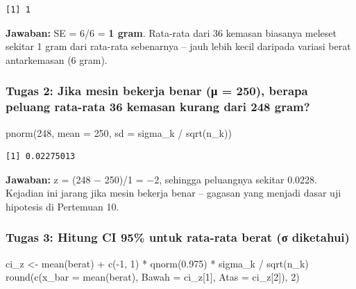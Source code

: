 \documentclass[
  indonesian,
  letterpaper,
]{book}
\newenvironment{Shaded}{\begin{snugshade}}{\end{snugshade}}
\newcommand{\AttributeTok}[1]{\textcolor[rgb]{0.40,0.45,0.13}{#1}}
\newcommand{\DecValTok}[1]{\textcolor[rgb]{0.68,0.00,0.00}{#1}}
\newcommand{\FloatTok}[1]{\textcolor[rgb]{0.68,0.00,0.00}{#1}}
\newcommand{\FunctionTok}[1]{\textcolor[rgb]{0.28,0.35,0.67}{#1}}
\newcommand{\NormalTok}[1]{\textcolor[rgb]{0.00,0.23,0.31}{#1}}
\newcommand{\OtherTok}[1]{\textcolor[rgb]{0.00,0.23,0.31}{#1}}
\newcommand{\SpecialCharTok}[1]{\textcolor[rgb]{0.37,0.37,0.37}{#1}}
\begin{document}
\begin{verbatim}
[1] 1
\end{verbatim}

\textbf{Jawaban:} SE = 6/6 = \textbf{1 gram}. Rata-rata dari 36 kemasan
biasanya meleset sekitar 1 gram dari rata-rata sebenarnya -- jauh lebih
kecil daripada variasi berat antarkemasan (6 gram).

\subsubsection{Tugas 2: Jika mesin bekerja benar (μ = 250), berapa
peluang rata-rata 36 kemasan kurang dari 248
gram?}\label{tugas-2-jika-mesin-bekerja-benar-ux3bc-250-berapa-peluang-rata-rata-36-kemasan-kurang-dari-248-gram}

\begin{Shaded}
\begin{Highlighting}[]
\FunctionTok{pnorm}\NormalTok{(}\DecValTok{248}\NormalTok{, }\AttributeTok{mean =} \DecValTok{250}\NormalTok{, }\AttributeTok{sd =}\NormalTok{ sigma\_k }\SpecialCharTok{/} \FunctionTok{sqrt}\NormalTok{(n\_k))}
\end{Highlighting}
\end{Shaded}

\begin{verbatim}
[1] 0.02275013
\end{verbatim}

\textbf{Jawaban:} z = (248 − 250)/1 = −2, sehingga peluangnya sekitar
0.0228. Kejadian ini jarang jika mesin bekerja benar -- gagasan yang
menjadi dasar uji hipotesis di Pertemuan 10.

\subsubsection{Tugas 3: Hitung CI 95\% untuk rata-rata berat (σ
diketahui)}\label{tugas-3-hitung-ci-95-untuk-rata-rata-berat-ux3c3-diketahui}

\begin{Shaded}
\begin{Highlighting}[]
\NormalTok{ci\_z }\OtherTok{\textless{}{-}} \FunctionTok{mean}\NormalTok{(berat) }\SpecialCharTok{+} \FunctionTok{c}\NormalTok{(}\SpecialCharTok{{-}}\DecValTok{1}\NormalTok{, }\DecValTok{1}\NormalTok{) }\SpecialCharTok{*} \FunctionTok{qnorm}\NormalTok{(}\FloatTok{0.975}\NormalTok{) }\SpecialCharTok{*}\NormalTok{ sigma\_k }\SpecialCharTok{/} \FunctionTok{sqrt}\NormalTok{(n\_k)}
\FunctionTok{round}\NormalTok{(}\FunctionTok{c}\NormalTok{(}\AttributeTok{x\_bar =} \FunctionTok{mean}\NormalTok{(berat), }\AttributeTok{Bawah =}\NormalTok{ ci\_z[}\DecValTok{1}\NormalTok{], }\AttributeTok{Atas =}\NormalTok{ ci\_z[}\DecValTok{2}\NormalTok{]), }\DecValTok{2}\NormalTok{)}
\end{Highlighting}
\end{Shaded}
\end{document}
